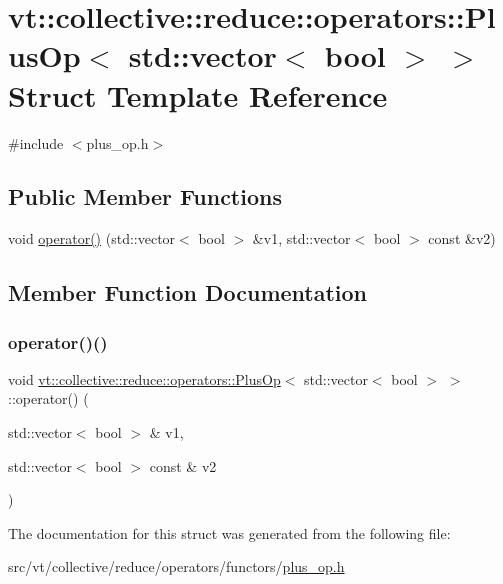 \hypertarget{structvt_1_1collective_1_1reduce_1_1operators_1_1_plus_op_3_01std_1_1vector_3_01bool_01_4_01_4}{}\section{vt\+:\+:collective\+:\+:reduce\+:\+:operators\+:\+:Plus\+Op$<$ std\+:\+:vector$<$ bool $>$ $>$ Struct Template Reference}
\label{structvt_1_1collective_1_1reduce_1_1operators_1_1_plus_op_3_01std_1_1vector_3_01bool_01_4_01_4}


{\ttfamily \#include $<$plus\+\_\+op.\+h$>$}

\subsection*{Public Member Functions}
\begin{DoxyCompactItemize}
\item 
void \hyperlink{structvt_1_1collective_1_1reduce_1_1operators_1_1_plus_op_3_01std_1_1vector_3_01bool_01_4_01_4_abe4d388d93c60f5e041cbedd75494fda}{operator()} (std\+::vector$<$ bool $>$ \&v1, std\+::vector$<$ bool $>$ const \&v2)
\end{DoxyCompactItemize}


\subsection{Member Function Documentation}
\mbox{\label{structvt_1_1collective_1_1reduce_1_1operators_1_1_plus_op_3_01std_1_1vector_3_01bool_01_4_01_4_abe4d388d93c60f5e041cbedd75494fda}} 
\subsubsection{\texorpdfstring{operator()()}{operator()()}}
{\footnotesize\ttfamily void \hyperlink{structvt_1_1collective_1_1reduce_1_1operators_1_1_plus_op}{vt\+::collective\+::reduce\+::operators\+::\+Plus\+Op}$<$ std\+::vector$<$ bool $>$ $>$\+::operator() (\begin{DoxyParamCaption}\item[{std\+::vector$<$ bool $>$ \&}]{v1,  }\item[{std\+::vector$<$ bool $>$ const \&}]{v2 }\end{DoxyParamCaption})\hspace{0.3cm}{\ttfamily [inline]}}



The documentation for this struct was generated from the following file\+:\begin{DoxyCompactItemize}
\item 
src/vt/collective/reduce/operators/functors/\hyperlink{plus__op_8h}{plus\+\_\+op.\+h}\end{DoxyCompactItemize}

